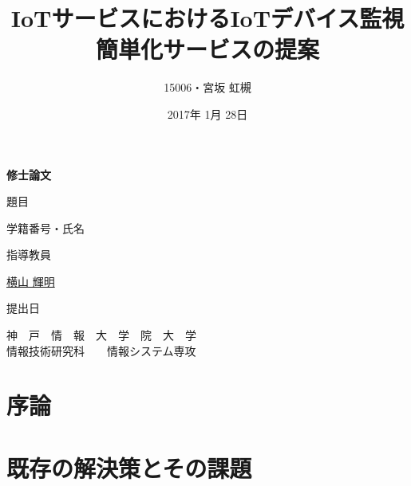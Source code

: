 \documentclass[a4paper]{jreport}
\begin{document}
\makeatletter

\title{IoTサービスにおけるIoTデバイス監視簡単化サービスの提案}
\author{15006・宮坂 虹槻}
\date{2017年 1月 28日}
\def\@teacher{横山 輝明}


\begin{titlepage}\begin{center}
\thispagestyle{plain}
{\Huge \textbf{修士論文} \par}
\vspace{1.5cm}
{\LARGE\gt 題目 \par}
{\LARGE\gt \underline{\@title} \par}
\vspace{2.5cm}
{\LARGE\gt 学籍番号・氏名 \par}
\vspace{1.5cm}
{\LARGE \underline{\@author} \par}
\vspace{1.5cm}
{\LARGE\gt 指導教員 \par}
\vspace{1.5cm}
{\LARGE\gt \underline{\@teacher} \par}
\vspace{1.5cm}
{\LARGE\gt 提出日 \par}
\vspace{1.5cm}
{\LARGE\gt \underline{\@date} \par}
\vspace{1.5cm}
{\Large\gt
神　戸　情　報　大　学　院　大　学\\
情報技術研究科　　情報システム専攻\\
\par}
\end{center}\end{titlepage}
\restoregeometry
\makeatother

\tableofcontents

\begin{abstract}

\end{abstract}

\chapter{序論}


\chapter{既存の解決策とその課題}

\end{document}
